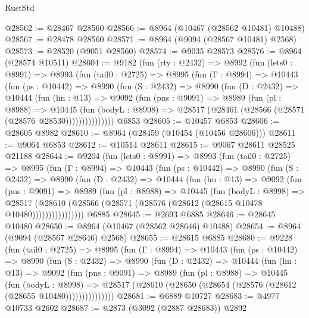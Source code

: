 \begin{lexlean}{RustStd}
\begin{coremodule}
@28562 := @28467 @28560
@28566 := @8964 (@10467 (@28562 @10481) @10488)
@28567 := @28478 @28560
@28571 := @8964 (@9094 (@28567 @10481) @2568)
@28573 := @28520 (@9051 @28560)
@28574 := @9035 @28573
@28576 := @8964 (@28574 @10511)
@28604 := @9182
    (fun (rty : @2432) =>
    @8992
      (fun (lets0 : @8991) =>
      @8993
        (fun (tail0 : @2725) =>
        @8995
          (fun (Γ : @8994) =>
          @10443
            (fun (ps : @10442) =>
            @8990
              (fun (S : @2432) =>
              @8990
                (fun (D : @2432) =>
                @10444
                  (fun (hn : @13) =>
                  @9092
                    (fun (pns : @9091) =>
                    @8989
                      (fun (pl : @8988) =>
                      @10445
                        (fun (bodyL : @8998) =>
                        @28517 (@28461 (@28566 (@28571 (@28576 @28530)))))))))))))))
    @6853
@28605 := @10457 @6853
@28606 := @28605 @8982
@28610 := @8964 (@28459 (@10454 (@10456 @28606)))
@28611 := @9064 @6853
@28612 := @10514 @28611
@28615 := @9067 @28611 @28525 @21188
@28644 := @9204
    (fun (lets0 : @8991) =>
    @8993
      (fun (tail0 : @2725) =>
      @8995
        (fun (Γ : @8994) =>
        @10443
          (fun (ps : @10442) =>
          @8990
            (fun (S : @2432) =>
            @8990
              (fun (D : @2432) =>
              @10444
                (fun (hn : @13) =>
                @9092
                  (fun (pns : @9091) =>
                  @8989
                    (fun (pl : @8988) =>
                    @10445
                      (fun (bodyL : @8998) =>
                      @28517
                        (@28610
                          (@28566 (@28571 (@28576 (@28612 (@28615 @10478 @10480))))))))))))))))
    @6885
@28645 := @2693 @6885
@28646 := @28645 @10480
@28650 := @8964 (@10467 (@28562 @28646) @10488)
@28654 := @8964 (@9094 (@28567 @28646) @2568)
@28655 := @28615 @6885
@28680 := @9228
    (fun (tail0 : @2725) =>
    @8995
      (fun (Γ : @8994) =>
      @10443
        (fun (ps : @10442) =>
        @8990
          (fun (S : @2432) =>
          @8990
            (fun (D : @2432) =>
            @10444
              (fun (hn : @13) =>
              @9092
                (fun (pns : @9091) =>
                @8989
                  (fun (pl : @8988) =>
                  @10445
                    (fun (bodyL : @8998) =>
                    @28517 (@28610 (@28650 (@28654 (@28576 (@28612 (@28655 @10480)))))))))))))))
@28681 := @6889 @10727
@28683 := @4977 @10733 @2602
@28687 := @2873 (@3092 (@2887 @28683)) @2892

\end{coremodule}
\end{lexlean}
